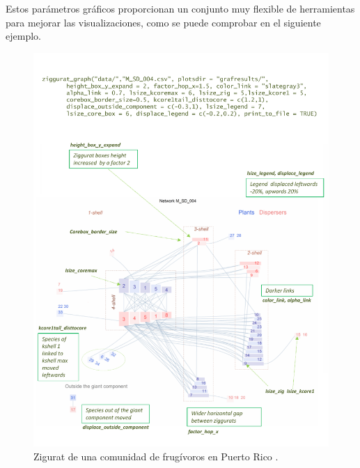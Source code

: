 Estos parámetros gráficos proporcionan un conjunto muy flexible de herramientas para mejorar las visualizaciones, como
se puede comprobar en el siguiente ejemplo.

\clearpage
\begin{figure}[hbt!]
\centering
\includegraphics[scale=0.8]{ManFigs/M_SD_004_ziggurat_improved.pdf}
\caption{Zigurat de una comunidad de frugívoros en Puerto Rico \cite{carlo2003avian}.}
\label{fig:M_SD_004_ziggurat_improved}
\end{figure}

